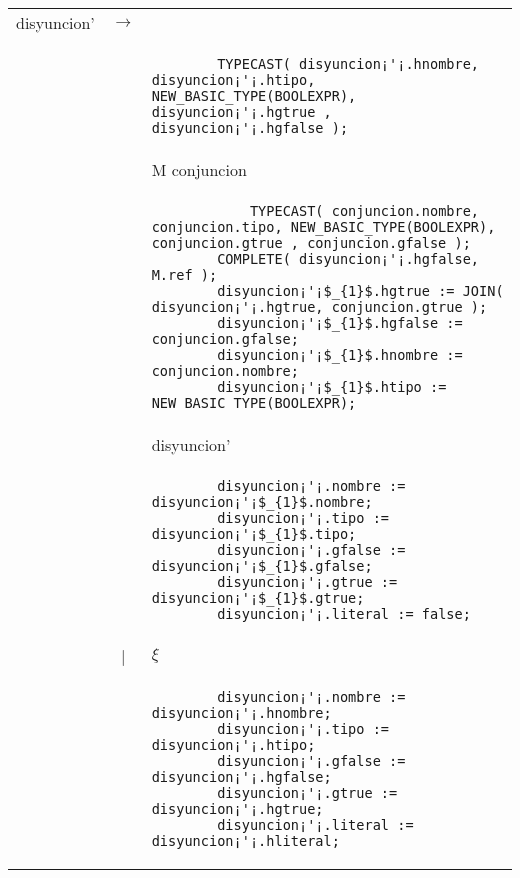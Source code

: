 \small
\begin{tabular}{r c p{}}						

			disyuncion'			& $\longrightarrow$ 	& \ter{or} \\
											&					& \begin{lstlisting}
		TYPECAST( disyuncion¡'¡.hnombre, disyuncion¡'¡.htipo, NEW_BASIC_TYPE(BOOLEXPR), disyuncion¡'¡.hgtrue , disyuncion¡'¡.hgfalse );
                    									\end{lstlisting} \\
								&					& M conjuncion \\
								&					& \begin{lstlisting}
        	TYPECAST( conjuncion.nombre, conjuncion.tipo, NEW_BASIC_TYPE(BOOLEXPR), conjuncion.gtrue , conjuncion.gfalse );
        COMPLETE( disyuncion¡'¡.hgfalse, M.ref );
        disyuncion¡'¡$_{1}$.hgtrue := JOIN( disyuncion¡'¡.hgtrue, conjuncion.gtrue );
        disyuncion¡'¡$_{1}$.hgfalse := conjuncion.gfalse;
        disyuncion¡'¡$_{1}$.hnombre := conjuncion.nombre;
        disyuncion¡'¡$_{1}$.htipo := NEW_BASIC_TYPE(BOOLEXPR);
                    									\end{lstlisting} \\
								&					& disyuncion' \\
								&					& \begin{lstlisting}
        disyuncion¡'¡.nombre := disyuncion¡'¡$_{1}$.nombre;
        disyuncion¡'¡.tipo := disyuncion¡'¡$_{1}$.tipo;
        disyuncion¡'¡.gfalse := disyuncion¡'¡$_{1}$.gfalse;
        disyuncion¡'¡.gtrue := disyuncion¡'¡$_{1}$.gtrue;
        disyuncion¡'¡.literal := false;
                    									\end{lstlisting} \\
									
								& | 					& $\xi$ \\
								&					& \begin{lstlisting}
        disyuncion¡'¡.nombre := disyuncion¡'¡.hnombre;
        disyuncion¡'¡.tipo := disyuncion¡'¡.htipo;
        disyuncion¡'¡.gfalse := disyuncion¡'¡.hgfalse;
        disyuncion¡'¡.gtrue := disyuncion¡'¡.hgtrue;
        disyuncion¡'¡.literal := disyuncion¡'¡.hliteral;
                    									\end{lstlisting} \\

\end{tabular}

